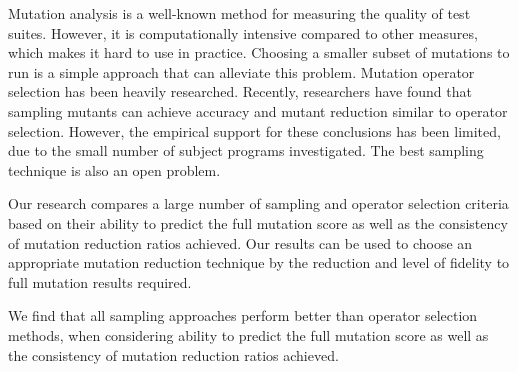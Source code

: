 Mutation analysis is a well-known method for measuring the quality of
test suites. However, it is computationally intensive compared to
other measures, which makes it hard to use in practice. Choosing a
smaller subset of mutations to run is a simple approach that can
alleviate this problem.  Mutation operator selection has been heavily
researched. Recently, researchers have found that sampling mutants can
achieve accuracy and mutant reduction similar to operator selection.
%
However, the empirical support for these conclusions has been limited, due to the small number of subject programs investigated.  The best sampling technique is also an open problem.


Our research compares a large number of sampling and operator
selection criteria based on their ability to predict the full mutation
score as well as the consistency of mutation reduction ratios
achieved. Our results can be used to choose an appropriate mutation
reduction technique by the reduction and level of fidelity to full
mutation results required.



We find that all sampling approaches perform better than operator
selection methods, when considering ability to predict the full
mutation score as well as the consistency of mutation reduction ratios
achieved.


